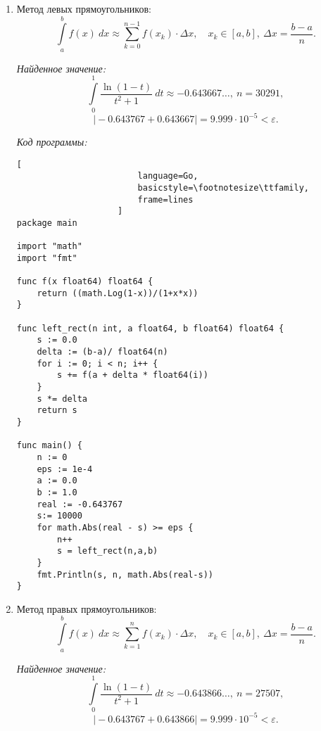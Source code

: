 \documentclass[14pt, a4paper, titlepage, fleqn]{extarticle}
\begin{document}
            \begin{enumerate}
                \item Метод левых прямоугольников:
                    \[
                        \int\limits_a^b f(x) ~ dx \approx
                        \sum_{k=0}^{n-1} f\left( x_k \right) \cdot \Delta x,
                        \quad x_k \in [a, b], ~ \Delta x = \frac{b-a}{n}. 
                    \]

                    \textit{Найденное значение:}
                    \[
                        \int\limits_0^1 \frac{\ln(1-t)}{t^2+1} ~ dt \approx
                        -0.643667\dots, ~ n = 30291,
                    \]
                    \[
                        \vert-0.643767+0.643667\vert = 9.999 
                        \cdot 10^{-5} < \varepsilon.
                    \]

                    \pagebreak

                    \textit{Код программы:}
                    \begin{lstlisting}[
                        language=Go,
                        basicstyle=\footnotesize\ttfamily,
                        frame=lines
                    ]
package main

import "math"
import "fmt"

func f(x float64) float64 {
    return ((math.Log(1-x))/(1+x*x))
}

func left_rect(n int, a float64, b float64) float64 {
    s := 0.0
    delta := (b-a)/ float64(n)
    for i := 0; i < n; i++ {
        s += f(a + delta * float64(i))
    }
    s *= delta
    return s
}

func main() {
    n := 0
    eps := 1e-4
    a := 0.0
    b := 1.0
    real := -0.643767
    s:= 10000
    for math.Abs(real - s) >= eps {
        n++
        s = left_rect(n,a,b)
    }
    fmt.Println(s, n, math.Abs(real-s))
}
                    \end{lstlisting}

                    \pagebreak

                \item Метод правых прямоугольников:
                    \[
                        \int\limits_a^b f(x) ~ dx \approx
                        \sum_{k=1}^{n} f\left( x_k \right) \cdot \Delta x,
                        \quad x_k \in [a, b], ~ \Delta x = \frac{b-a}{n}.  
                    \]


                    \textit{Найденное значение:}
                    \[
                        \int\limits_0^1 \frac{\ln(1-t)}{t^2+1} ~ dt \approx
                        -0.643866\dots, ~ n = 27507,
                    \]
                    \[
                        \vert-0.643767+0.643866\vert = 9.999 
                        \cdot 10^{-5} < \varepsilon.
                    \]


\end{enumerate}
\end{document}
